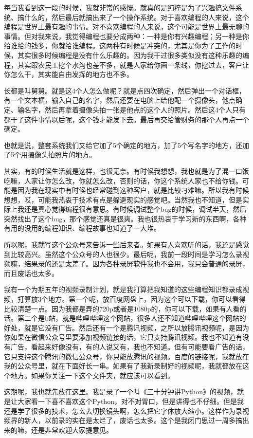 \documentclass[
  letterpaper,
  DIV=11,
  numbers=noendperiod]{scrreprt}
\begin{document}
每当我看到这一段的时候，我就非常的感慨。就真的是纯粹是为了兴趣搞文件系统、搞什么的，然后最后就搞出来了一个操作系统。对于喜欢编程的人来说，这个编程是世界上最有趣的事情。对不喜欢编程的人来说，这个可能是世界上最无聊的事情。但对我来说，我觉得编程也要分成两种：一种是你有兴趣编程；另一种是你给谁给的钱多，你就给谁编程。这两种有时候是冲突的，尤其是你为了工作的时候，其实很多时候编程是没有什么乐趣的。因为我干过很多类似没有这种乐趣的编程，其实跟农民工挖个水沟也差不多，就是人家给你画一条线，你挖过去，客户让你怎么干，其实能自由发挥的地方也不多。

长都是叫舅舅。就是这4个人怎么做呢？就是点四次确定，然后弹出一个对话框，有一个文本框，输入自己的名字，然后还要在电脑上给他配一个摄像头，他点确定、输名字，然后再拿着摄像头拍一张是他点的这个人的照片。然后这4个人只有都干了这件事情以后呢，这个钱才能发下去。最后再交给管财务的那个人再点一个确定。

也就是说，整套系统我们又给它加了5个确定的地方，加了5个写名字的地方，还加了5个用摄像头拍照片的地方。

其实，有的时候生活就是这样，也很无奈。有时候我想想，我也就是为了混一口饭吃嘛，人家让你怎么改，你就怎么改，否则的话，你这个系统人家也不给你钱。可能是因为我在现实中有时候也经常碰到这种客户，就是比较刁难嘛。所以我有时候想想，哎，可能我热衷于技术有点是躲避现实的感觉吧。当然我也不知道，但是实际上我还是真心觉得编程很有意思。有时候调试整个bug的时候，调试半天，然后突然找出了这个bug，那个感觉还真是很爽。我也很热衷于学习新的东西啊，各种有用的没用的编程知识、编程故事也知道了一大堆。

所以呢，我就写这个公众号来告诉一些后来者。如果有人喜欢听的话，我还是感觉到比较高兴。虽然这个公众号的人也很少。最后呢，我前一段时间是学习怎么录视频嘛，结果录的还是太差了。因为各种录屏软件我也不会用，我只会普通的录屏，而且废话也太多。

我有一个为期五年的视频录制计划，就是我打算把我知道的这些编程知识都录成视频，打算放3个地方。第一个呢，放百度网盘上，因为这个可以下载，你可以看得比较清楚一点。因为我都是弄的720p或者是1080p的，你可以下载，如果有人看的话。第二个是b站，就是哔哩哔哩这个网站，很多人还不知道哔哩哔哩这个网站的好处，就是它没有广告。然后还有一个是腾讯视频，之所以放腾讯视频呢，是因为你如果在微信公众号里要添加视频链接的话，它只支持腾讯视频。我也不知道有没有广告，看起来好像没有，有的人说又有，我也不知道。但有可能要看广告的话，它只支持这个腾讯的微信公众号，你只能放腾讯的视频。百度的链接呢，我就放在我的公众号里，就在下面好长一串。如果有了我新录制好的视频呢，我就都放在这个地方。如果你关注一下这个文件夹，就应该可以看到。

这期呢，我也就先放在这里。我是录了一个叫《三十分钟讲Python》的视频，就是让大家看一下喜不喜欢这个Python，对不对胃口，但是讲得也不仔细。但是我还是学了很多的技术，怎么去切换镜头啊，怎么把它字体放大缩小。这样作为录视频界的新人，以前录的实在是太烂了，废话也太多。这个是我闭门思过一周多搞出来的嘛，还是非常欢迎大家提意见。
\end{document}
